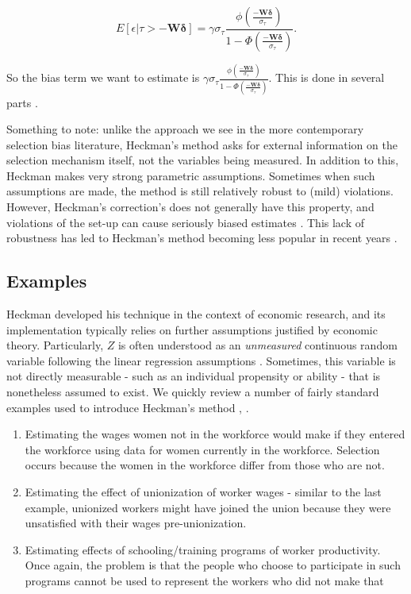 \documentclass[12pt,twoside]{reedthesis}
\theoremstyle{definition}
\begin{document}
$$E[\epsilon | \tau > -\mathbf{W} \boldsymbol{\delta}] = \gamma \sigma_{\tau}\frac{\phi(\frac{-\mathbf{W} \boldsymbol{\delta}}{\sigma_\tau})}{1 - \Phi(\frac{-\mathbf{W} \boldsymbol{\delta}}{\sigma_\tau})}.$$				

So the bias term  we want to estimate is $\gamma\sigma_{\tau}\frac{\phi(\frac{-\mathbf{W} \boldsymbol{\delta}}{\sigma_\tau})}{1 - \Phi(\frac{-\mathbf{W} \boldsymbol{\delta}}{\sigma_\tau})}$. This is done in several parts \cite{Heckman_1979}.

Something to note: unlike the approach we see in the more contemporary selection bias literature, Heckman's method asks for external information on the selection mechanism itself, not the variables being measured. In addition to this, Heckman makes very strong parametric assumptions. Sometimes when such assumptions are made, the method is still relatively robust to (mild) violations.  However, Heckman's correction's does not generally have this property, and violations of the set-up can cause seriously biased estimates \citep{Little_1986}. This lack of robustness has led to Heckman's method becoming less popular in recent years \citep{Bushway_2007}.



\subsection{Examples}

Heckman developed his technique in the context of economic research, and its implementation typically relies on further assumptions justified by economic theory. Particularly, $Z$ is often understood as an \emph{unmeasured} continuous random variable following the linear regression assumptions \citep{Winship_Mare_1992}. Sometimes,  this variable is not directly measurable - such as an individual propensity or ability - that is nonetheless assumed to exist. We quickly review a number of  fairly standard  examples used to introduce Heckman's method \citep{Heckman_1979}, \citep{Guo_2015}.

\begin{enumerate}
\item Estimating the wages women not in the workforce would make if they entered the workforce using data for women currently in the workforce. Selection occurs because the women in the workforce differ from those who are not.

\item Estimating the effect of unionization of worker wages - similar to the last example, unionized workers might have joined the union because they were unsatisfied with their wages pre-unionization.

\item Estimating effects of schooling/training programs of worker productivity. Once again, the problem is that the people who choose to participate in such programs cannot be used to represent the workers who did not make that 
\end{enumerate}
\end{document}
